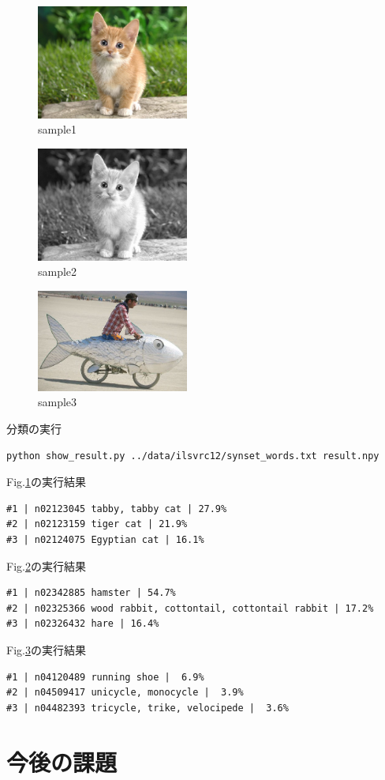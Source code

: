 \documentclass[a4paper,10pt]{jsarticle}
\begin{document}
\begin{figure}[b]
 \centering	
    \includegraphics[width=50mm]{../02nd/fig/cat.eps}
   \caption{sample1}
	 \label{sample1}
\end{figure}
\begin{figure}[b]
\centering
    \includegraphics[width=50mm]{../02nd/fig/cat_gray.eps}
\caption{sample2}	 
 \label{sample2}
\end{figure}
\begin{figure}[b]
\centering
    \includegraphics[width=50mm]{../02nd/fig/fish-bike.eps}
\caption{sample3}
\label{sample3}
\end{figure}

分類の実行
\begin{lstlisting}[basicstyle=\ttfamily\footnotesize, frame=single]
python show_result.py ../data/ilsvrc12/synset_words.txt result.npy
\end{lstlisting}

Fig.\ref{sample1}の実行結果
\begin{lstlisting}[basicstyle=\ttfamily\footnotesize, frame=single]
#1 | n02123045 tabby, tabby cat | 27.9%
#2 | n02123159 tiger cat | 21.9%
#3 | n02124075 Egyptian cat | 16.1%
\end{lstlisting}

Fig.\ref{sample2}の実行結果
\begin{lstlisting}[basicstyle=\ttfamily\footnotesize, frame=single]
#1 | n02342885 hamster | 54.7%
#2 | n02325366 wood rabbit, cottontail, cottontail rabbit | 17.2%
#3 | n02326432 hare | 16.4%
\end{lstlisting}

Fig.\ref{sample3}の実行結果
\begin{lstlisting}[basicstyle=\ttfamily\footnotesize, frame=single]
#1 | n04120489 running shoe |  6.9%
#2 | n04509417 unicycle, monocycle |  3.9%
#3 | n04482393 tricycle, trike, velocipede |  3.6%
\end{lstlisting}

\section{今後の課題}
\end{document}
